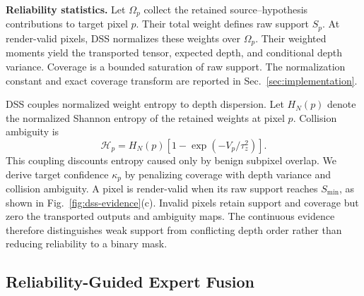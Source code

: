 \documentclass[letterpaper,10pt,conference]{ieeeconf}
\begin{document}
\noindent\textbf{Reliability statistics.}
Let $\Omega_p$ collect the retained source--hypothesis contributions to target
pixel $p$. Their total weight defines raw support $S_p$. At render-valid pixels,
DSS normalizes these weights over $\Omega_p$. Their weighted moments yield the
transported tensor, expected depth, and conditional depth variance. Coverage
is a bounded saturation of raw support. The normalization constant and exact
coverage transform are reported in Sec.~\ref{sec:implementation}.

DSS couples normalized weight entropy to depth dispersion. Let $H_N(p)$ denote
the normalized Shannon entropy of the retained weights at pixel $p$. Collision
ambiguity is
\begin{equation}
 \mathcal H_p
 =H_N(p)\left[1-\exp(-V_p/\tau_z^2)\right].
\label{eq:collision-entropy}
\end{equation}
This coupling discounts entropy caused only by benign subpixel overlap. We
derive target confidence $\kappa_p$ by penalizing coverage with depth variance
and collision ambiguity. A pixel is render-valid when its raw support reaches
$S_{\min}$, as shown in Fig.~\ref{fig:dss-evidence}(c). Invalid pixels retain
support and coverage but zero the transported outputs and ambiguity maps. The
continuous evidence therefore distinguishes weak support from conflicting depth
order rather than reducing reliability to a binary mask.

\subsection{Reliability-Guided Expert Fusion}
\end{document}
